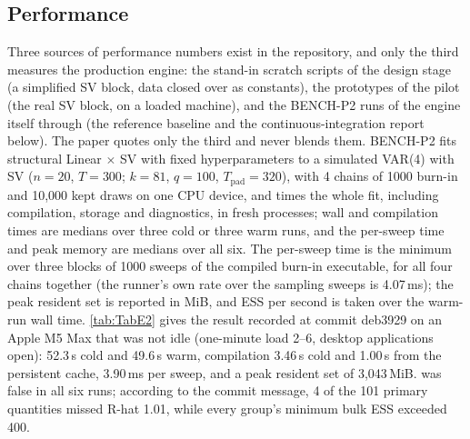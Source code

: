 \subsection{Performance}\label{app:performance}

Three sources of performance numbers exist in the repository, and only the third measures the
production engine: the stand-in scratch scripts of the design stage (a simplified SV block, data
closed over as constants), the prototypes of the pilot (the real SV block, on a loaded
machine), and the BENCH-P2 runs of the engine itself through  (the reference
baseline and the continuous-integration report below).
The paper quotes only the third and never blends them.
BENCH-P2 fits structural Linear $\times$ SV with fixed hyperparameters to a simulated VAR(4) with SV
($n = 20$, $T = 300$; $k = 81$, $q = 100$, $T_{\mathrm{pad}} = 320$), with 4 chains of 1000 burn-in
and 10,000 kept draws on one CPU device, and times the whole fit, including compilation, storage and
diagnostics, in fresh processes; wall and compilation times are medians over three cold or three
warm runs, and the per-sweep time and peak memory are medians over all six.
The per-sweep time is the minimum over three blocks of 1000 sweeps of the compiled burn-in
executable, for all four chains together (the runner's own rate over the sampling sweeps is
4.07\,ms); the peak resident set is reported in MiB, and ESS per second is taken over the warm-run
wall time.
\cref{tab:TabE2} gives the result recorded at commit deb3929 on an Apple M5 Max that was not
idle (one-minute load 2--6, desktop applications open): 52.3\,s cold and 49.6\,s warm, compilation
3.46\,s cold and 1.00\,s from the persistent cache, 3.90\,ms per sweep, and a peak resident set of
3,043\,MiB.
 was false in all six runs; according to the commit message, 4 of the 101 primary
quantities missed R-hat 1.01, while every group's minimum bulk ESS exceeded 400.
